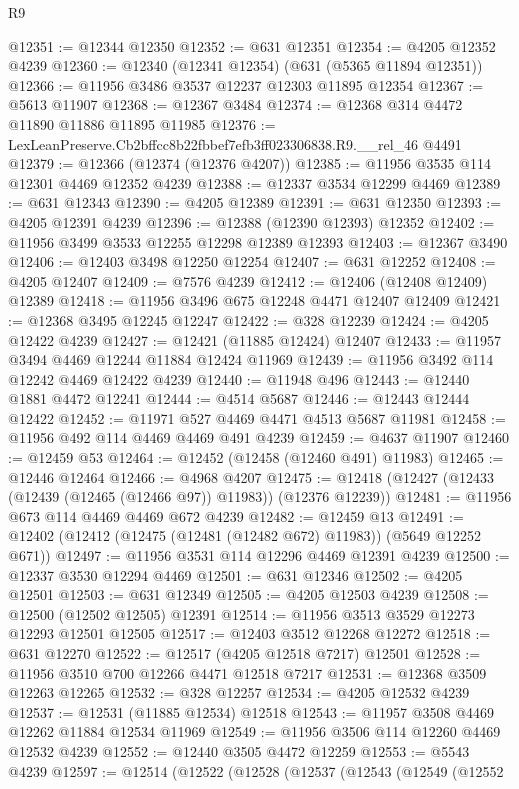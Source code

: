 \begin{lexlean}{R9}
\begin{coremodule}
@12351 := @12344 @12350
@12352 := @631 @12351
@12354 := @4205 @12352 @4239
@12360 := @12340 (@12341 @12354) (@631 (@5365 @11894 @12351))
@12366 := @11956 @3486 @3537 @12237 @12303 @11895 @12354
@12367 := @5613 @11907
@12368 := @12367 @3484
@12374 := @12368 @314 @4472 @11890 @11886 @11895 @11985
@12376 := LexLeanPreserve.Cb2bffcc8b22fbbef7efb3ff023306838.R9.__rel_46 @4491
@12379 := @12366 (@12374 (@12376 @4207))
@12385 := @11956 @3535 @114 @12301 @4469 @12352 @4239
@12388 := @12337 @3534 @12299 @4469
@12389 := @631 @12343
@12390 := @4205 @12389
@12391 := @631 @12350
@12393 := @4205 @12391 @4239
@12396 := @12388 (@12390 @12393) @12352
@12402 := @11956 @3499 @3533 @12255 @12298 @12389 @12393
@12403 := @12367 @3490
@12406 := @12403 @3498 @12250 @12254
@12407 := @631 @12252
@12408 := @4205 @12407
@12409 := @7576 @4239
@12412 := @12406 (@12408 @12409) @12389
@12418 := @11956 @3496 @675 @12248 @4471 @12407 @12409
@12421 := @12368 @3495 @12245 @12247
@12422 := @328 @12239
@12424 := @4205 @12422 @4239
@12427 := @12421 (@11885 @12424) @12407
@12433 := @11957 @3494 @4469 @12244 @11884 @12424 @11969
@12439 := @11956 @3492 @114 @12242 @4469 @12422 @4239
@12440 := @11948 @496
@12443 := @12440 @1881 @4472 @12241
@12444 := @4514 @5687
@12446 := @12443 @12444 @12422
@12452 := @11971 @527 @4469 @4471 @4513 @5687 @11981
@12458 := @11956 @492 @114 @4469 @4469 @491 @4239
@12459 := @4637 @11907
@12460 := @12459 @53
@12464 := @12452 (@12458 (@12460 @491) @11983)
@12465 := @12446 @12464
@12466 := @4968 @4207
@12475 := @12418 (@12427 (@12433 (@12439 (@12465 (@12466 @97)) @11983)) (@12376 @12239))
@12481 := @11956 @673 @114 @4469 @4469 @672 @4239
@12482 := @12459 @13
@12491 := @12402 (@12412 (@12475 (@12481 (@12482 @672) @11983)) (@5649 @12252 @671))
@12497 := @11956 @3531 @114 @12296 @4469 @12391 @4239
@12500 := @12337 @3530 @12294 @4469
@12501 := @631 @12346
@12502 := @4205 @12501
@12503 := @631 @12349
@12505 := @4205 @12503 @4239
@12508 := @12500 (@12502 @12505) @12391
@12514 := @11956 @3513 @3529 @12273 @12293 @12501 @12505
@12517 := @12403 @3512 @12268 @12272
@12518 := @631 @12270
@12522 := @12517 (@4205 @12518 @7217) @12501
@12528 := @11956 @3510 @700 @12266 @4471 @12518 @7217
@12531 := @12368 @3509 @12263 @12265
@12532 := @328 @12257
@12534 := @4205 @12532 @4239
@12537 := @12531 (@11885 @12534) @12518
@12543 := @11957 @3508 @4469 @12262 @11884 @12534 @11969
@12549 := @11956 @3506 @114 @12260 @4469 @12532 @4239
@12552 := @12440 @3505 @4472 @12259
@12553 := @5543 @4239
@12597 := @12514
    (@12522
      (@12528
        (@12537
          (@12543
            (@12549
              (@12552

\end{coremodule}
\end{lexlean}
